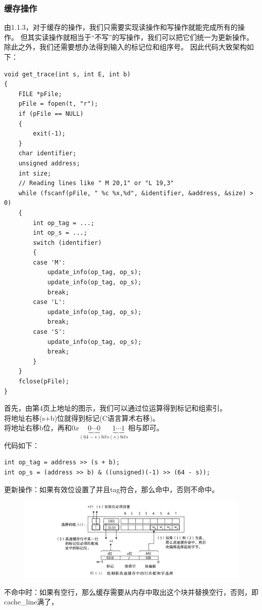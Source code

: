 \documentclass[12pt, a4paper, oneside]{ctexart}
\begin{document}
\subsubsection{缓存操作}
\noindent
由1.1.3，对于缓存的操作，我们只需要实现读操作和写操作就能完成所有的操作。
但其实读操作就相当于“不写”的写操作，我们可以把它们统一为更新操作。
除此之外，我们还需要想办法得到输入的标记位和组序号。
因此代码大致架构如下：
\begin{lstlisting}
void get_trace(int s, int E, int b)
{
    FILE *pFile;
    pFile = fopen(t, "r");
    if (pFile == NULL)
    {
        exit(-1);
    }
    char identifier;
    unsigned address;
    int size;
    // Reading lines like " M 20,1" or "L 19,3"
    while (fscanf(pFile, " %c %x,%d", &identifier, &address, &size) > 0)
    {
        int op_tag = ...;
        int op_s = ...;
        switch (identifier)
        {
        case 'M': 
            update_info(op_tag, op_s);
            update_info(op_tag, op_s);
            break;
        case 'L':
            update_info(op_tag, op_s);
            break;
        case 'S':
            update_info(op_tag, op_s);
            break;
        }
    }
    fclose(pFile);
}
\end{lstlisting}
首先，由第4页上地址的图示，我们可以通过位运算得到标记和组索引。\\
将地址右移(s+b)位就得到标记(C语言算术右移)。\\
将地址右移b位，再和$0x\underbrace{0 \cdots 0}_{(64-s)bits}\underbrace{1 \cdots 1}_{(s) bits}$相与即可。\\
代码如下：
\begin{lstlisting}
int op_tag = address >> (s + b);
int op_s = (address >> b) & ((unsigned)(-1) >> (64 - s));
\end{lstlisting}
更新操作：如果有效位设置了并且tag符合，那么命中，否则不命中。\\
\begin{figure}[hbtp]
    \includegraphics[scale=0.4]{image/2-3.png}
\end{figure}
不命中时：如果有空行，那么缓存需要从内存中取出这个块并替换空行，否则，即cache\_line满了，
\end{document}

